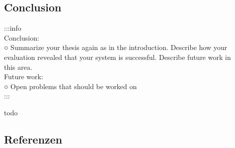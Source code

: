 \documentclass[
]{article}
\begin{document}
\hypertarget{header-n94}{%
\subsection{Conclusion}\label{header-n94}}

:::info\\
Conclusion:\\
○ Summarize your thesis again as in the introduction. Describe how
your\\
evaluation revealed that your system is successful. Describe future work
in \\
this area.\\
Future work:\\
○ Open problems that should be worked on\\
:::

todo

\hypertarget{header-n97}{%
\subsection{Referenzen}\label{header-n97}}
\end{document}
